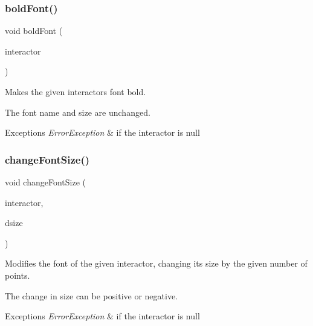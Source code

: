 \subsubsection{\texorpdfstring{bold\+Font()}{boldFont()}}
{\footnotesize\ttfamily void bold\+Font (\begin{DoxyParamCaption}\item[{\mbox{\hyperlink{classGInteractor}{G\+Interactor}} $\ast$}]{interactor }\end{DoxyParamCaption})\hspace{0.3cm}{\ttfamily [static]}}



Makes the given interactor\textquotesingle{}s font bold. 

The font name and size are unchanged. 
\begin{DoxyExceptions}{Exceptions}
{\em Error\+Exception} & if the interactor is null \\
\hline
\end{DoxyExceptions}
\mbox{\label{classGFont_ae6714d087455b3431d6dce6f1202659f}} 
\subsubsection{\texorpdfstring{change\+Font\+Size()}{changeFontSize()}\hspace{0.1cm}{\footnotesize\ttfamily [1/3]}}
{\footnotesize\ttfamily void change\+Font\+Size (\begin{DoxyParamCaption}\item[{\mbox{\hyperlink{classGInteractor}{G\+Interactor}} $\ast$}]{interactor,  }\item[{int}]{dsize }\end{DoxyParamCaption})\hspace{0.3cm}{\ttfamily [static]}}



Modifies the font of the given interactor, changing its size by the given number of points. 

The change in size can be positive or negative. 
\begin{DoxyExceptions}{Exceptions}
{\em Error\+Exception} & if the interactor is null \\
\hline
\end{DoxyExceptions}
\mbox{\label{classGFont_a8efb627bfbb3c5dddb8453dd8668880a}} 

